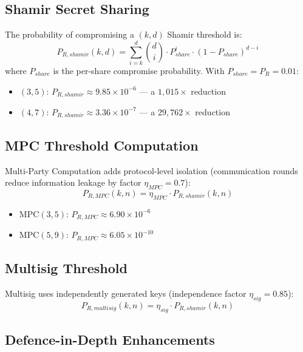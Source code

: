 \documentclass[10pt,twocolumn,letterpaper]{article}
\begin{document}
\subsection{Shamir Secret Sharing}

The probability of compromising a $(k, d)$ Shamir threshold is:
\begin{equation}
P_{R,shamir}(k,d) = \sum_{i=k}^{d} \binom{d}{i} \cdot P_{share}^i \cdot (1 - P_{share})^{d-i}
\end{equation}
where $P_{share}$ is the per-share compromise probability. With $P_{share} = P_R = 0.01$:
\begin{itemize}[leftmargin=*]
    \item $(3,5)$: $P_{R,shamir} \approx 9.85 \times 10^{-6}$ --- a $1{,}015\times$ reduction
    \item $(4,7)$: $P_{R,shamir} \approx 3.36 \times 10^{-7}$ --- a $29{,}762\times$ reduction
\end{itemize}

\subsection{MPC Threshold Computation}

Multi-Party Computation adds protocol-level isolation (communication rounds reduce information leakage by factor $\eta_{MPC} = 0.7$):
\begin{equation}
P_{R,MPC}(k,n) = \eta_{MPC} \cdot P_{R,shamir}(k,n)
\end{equation}
\begin{itemize}[leftmargin=*]
    \item MPC$(3,5)$: $P_{R,MPC} \approx 6.90 \times 10^{-6}$
    \item MPC$(5,9)$: $P_{R,MPC} \approx 6.05 \times 10^{-10}$
\end{itemize}

\subsection{Multisig Threshold}

Multisig uses independently generated keys (independence factor $\eta_{sig} = 0.85$):
\begin{equation}
P_{R,multisig}(k,n) = \eta_{sig} \cdot P_{R,shamir}(k,n)
\end{equation}

\subsection{Defence-in-Depth Enhancements}
\end{document}
